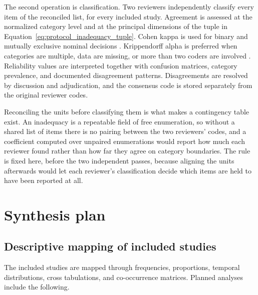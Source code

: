 The second operation is classification. Two reviewers independently classify every item of the reconciled list, for every included study. Agreement is assessed at the normalized category level and at the principal dimensions of the tuple in Equation~\ref{eq:protocol_inadequacy_tuple}. Cohen kappa is used for binary and mutually exclusive nominal decisions \cite{Cohen1960Kappa}. Krippendorff alpha is preferred when categories are multiple, data are missing, or more than two coders are involved \cite{Krippendorff2018Content}. Reliability values are interpreted together with confusion matrices, category prevalence, and documented disagreement patterns. Disagreements are resolved by discussion and adjudication, and the consensus code is stored separately from the original reviewer codes.

Reconciling the units before classifying them is what makes a contingency table exist. An inadequacy is a repeatable field of free enumeration, so without a shared list of items there is no pairing between the two reviewers' codes, and a coefficient computed over unpaired enumerations would report how much each reviewer found rather than how far they agree on category boundaries. The rule is fixed here, before the two independent passes, because aligning the units afterwards would let each reviewer's classification decide which items are held to have been reported at all.

\section{Synthesis plan}
\label{sec:protocol_synthesis}

\subsection{Descriptive mapping of included studies}

The included studies are mapped through frequencies, proportions, temporal distributions, cross tabulations, and co-occurrence matrices. Planned analyses include the following.

